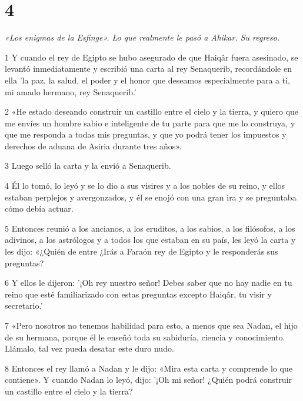 \chapter{4}

\par \textit{«Los enigmas de la Esfinge». Lo que realmente le pasó a Ahikar. Su regreso.}

\par 1 Y cuando el rey de Egipto se hubo asegurado de que Haiqâr fuera asesinado, se levantó inmediatamente y escribió una carta al rey Senaquerib, recordándole en ella 'la paz, la salud, el poder y el honor que deseamos especialmente para a ti, mi amado hermano, rey Senaquerib.'

\par 2 «He estado deseando construir un castillo entre el cielo y la tierra, y quiero que me envíes un hombre sabio e inteligente de tu parte para que me lo construya, y que me responda a todas mis preguntas, y que yo podrá tener los impuestos y derechos de aduana de Asiria durante tres años».

\par 3 Luego selló la carta y la envió a Senaquerib.

\par 4 Él lo tomó, lo leyó y se lo dio a sus visires y a los nobles de su reino, y ellos estaban perplejos y avergonzados, y él se enojó con una gran ira y se preguntaba cómo debía actuar.

\par 5 Entonces reunió a los ancianos, a los eruditos, a los sabios, a los filósofos, a los adivinos, a los astrólogos y a todos los que estaban en su país, les leyó la carta y les dijo: «¿Quién de entre ¿Irás a Faraón rey de Egipto y le responderás sus preguntas?

\par 6 Y ellos le dijeron: '¡Oh rey nuestro señor! Debes saber que no hay nadie en tu reino que esté familiarizado con estas preguntas excepto Haiqâr, tu visir y secretario.'

\par 7 «Pero nosotros no tenemos habilidad para esto, a menos que sea Nadan, el hijo de su hermana, porque él le enseñó toda su sabiduría, ciencia y conocimiento. Llámalo, tal vez pueda desatar este duro nudo.

\par 8 Entonces el rey llamó a Nadan y le dijo: «Mira esta carta y comprende lo que contiene». Y cuando Nadan lo leyó, dijo: '¡Oh mi señor! ¿Quién podrá construir un castillo entre el cielo y la tierra?

